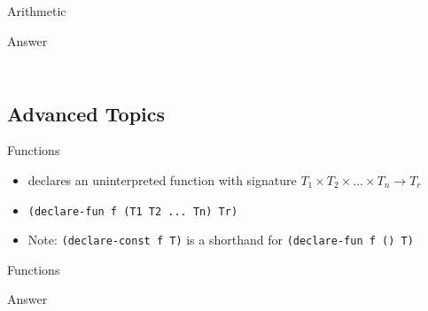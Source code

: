 \documentclass[10pt]{beamer}
\begin{document}
\begin{frame}{Arithmetic}
  \begin{alertblock}{Answer}
    \inputminted{lisp}{./src/ex4.smt2}
    \inputminted{lisp}{./src/ex4-out.smt2}
  \end{alertblock}
\end{frame}

\subsection{Advanced Topics}

\begin{frame}[fragile]{Functions}
  \begin{itemize}[<+->]
    \item declares an uninterpreted function with signature $T_1 \times T_2 \times \dots \times T_n \to T_r$
    \item \texttt{(declare-fun f (T1 T2 ... Tn) Tr)}
    \item \alert{Note:} \texttt{(declare-const f T)} is a shorthand for \texttt{(declare-fun f () T)}
  \end{itemize}
\end{frame}

\begin{frame}{Functions}
  \begin{alertblock}{Answer}
    \inputminted{lisp}{./src/ex5.smt2}
    \inputminted[mathescape=true]{lisp}{./src/ex5-out.smt2}
  \end{alertblock}
\end{frame}
\end{document}

